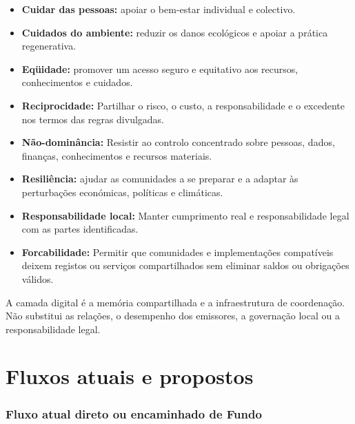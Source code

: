 \documentclass[11pt]{article}
\begin{document}
\begin{itemize}[leftmargin=*]
\item \textbf{Cuidar das pessoas:} apoiar o bem-estar individual e colectivo.
\item \textbf{Cuidados do ambiente:} reduzir os danos ecológicos e apoiar a prática regenerativa.
\item \textbf{Eqüidade:} promover um acesso seguro e equitativo aos recursos, conhecimentos e cuidados.
\item \textbf{Reciprocidade:} Partilhar o risco, o custo, a responsabilidade e o excedente nos termos das regras divulgadas.
\item \textbf{Não-dominância:} Resistir ao controlo concentrado sobre pessoas, dados, finanças, conhecimentos e recursos materiais.
\item \textbf{Resiliência:} ajudar as comunidades a se preparar e a adaptar às perturbações económicas, políticas e climáticas.
\item \textbf{Responsabilidade local:} Manter cumprimento real e responsabilidade legal com as partes identificadas.
\item \textbf{Forcabilidade:} Permitir que comunidades e implementações compatíveis deixem registos ou serviços compartilhados sem eliminar saldos ou obrigações válidos.
\end{itemize}
A camada digital é a memória compartilhada e a infraestrutura de coordenação. Não substitui as relações, o desempenho dos emissores, a governação local ou a responsabilidade legal.

\section*{Fluxos atuais e propostos}

\subsubsection*{Fluxo atual direto ou encaminhado de Fundo}
\end{document}
